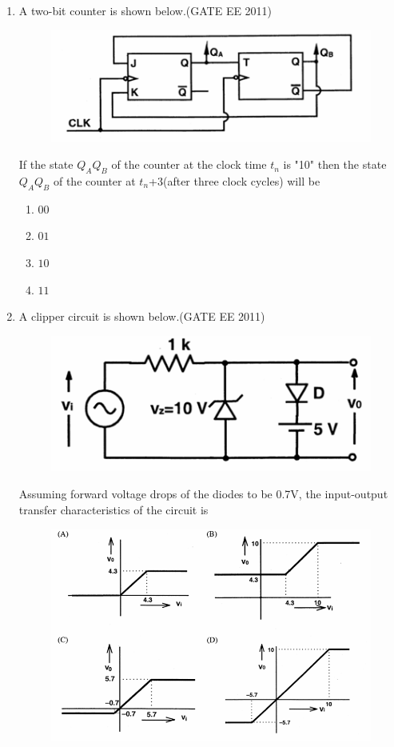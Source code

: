 \documentclass[a4paper,10pt]{exam}
\theoremstyle{remark}
\begin{document}
\begin{enumerate}
\noindent\rule{\textwidth}{0.4pt}

\item \quad A two-bit counter is shown below.\hfill{(GATE EE 2011)}
\begin{figure}[H]
    \centering
    \includegraphics[width=0.75\columnwidth]{figs/Q 46.png}\caption{}     \label{fig:myfigure}
\end{figure}
If the state $Q_{A}Q_{B}$ of the counter at the clock time $t_{n}$ is "10" then the state $Q_{A}Q_{B}$ of the counter at $t_{n}$+3(after three clock cycles) will be 

\begin{multicols}{4}
\begin{enumerate}
\item $00$
\item $01$
\item $10$
\item $11$
\end{enumerate}
\end{multicols}
\item \quad A clipper circuit is shown below.\hfill{(GATE EE 2011)}
\begin{figure}[H]
    \centering
    \includegraphics[width=0.4\columnwidth]{figs/Q 47.png}\caption{}     \label{fig:myfigure}
\end{figure}
Assuming forward voltage drops of the diodes to be 0.7V, the input-output transfer characteristics of the circuit is
\begin{figure}[H]
    \centering
    \includegraphics[width=0.7\columnwidth]{figs/Q 47 opt.png}
\end{figure}


\end{enumerate}
\end{document}

